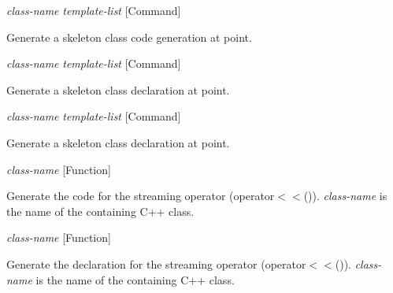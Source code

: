 \vspace{1em}
\noindent
{}
\usebox{\funcname}\emph{class-name} \emph{template-list}
 \hfill [Command]

\begin{doc-string}
Generate a skeleton class code generation at point.
\end{doc-string}

\vspace{1em}
\noindent
{}
\usebox{\funcname}\emph{class-name} \emph{template-list}
 \hfill [Command]

\begin{doc-string}
Generate a skeleton class declaration at point.
\end{doc-string}

\vspace{1em}
\noindent
{}
\usebox{\funcname}\emph{class-name} \emph{template-list}
 \hfill [Command]

\begin{doc-string}
Generate a skeleton class declaration at point.
\end{doc-string}

\vspace{1em}
\noindent
{}
\usebox{\funcname}\emph{class-name}
 \hfill [Function]
\hspace*{\wd\funcname}

\begin{doc-string}
Generate the code for the streaming operator (operator$<$$<$()).  \emph{class-name} is the
name of the containing C++ class.
\end{doc-string}

\vspace{1em}
\noindent
{}
\usebox{\funcname}\emph{class-name}
 \hfill [Function]
\hspace*{\wd\funcname}

\begin{doc-string}
Generate the declaration for the streaming operator (operator$<$$<$()).
\emph{class-name} is the name of the containing C++ class.
\end{doc-string}

